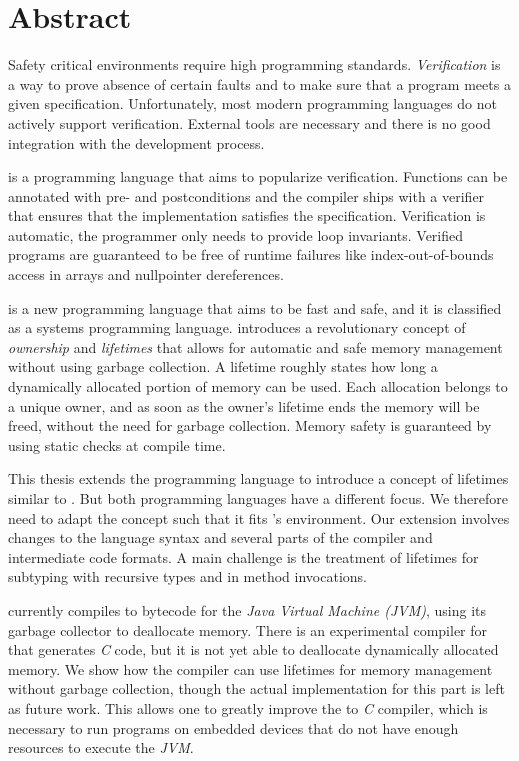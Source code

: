 \section*{Abstract}
Safety critical environments require high programming standards.
\emph{Verification}	is a way to prove absence of certain faults and to make sure that a program meets a given specification.
Unfortunately, most modern programming languages do not actively support verification.
External tools are necessary and there is no good integration with the development process.

\whiley is a programming language that aims to popularize verification.
Functions can be annotated with pre- and postconditions and the compiler ships with a verifier that ensures that the implementation satisfies the specification.
Verification is automatic, the programmer only needs to provide loop invariants.
Verified \whiley programs are guaranteed to be free of runtime failures like index-out-of-bounds access in arrays and nullpointer dereferences.

\rust is a new programming language that aims to be fast and safe, and it is classified as a systems programming language.
\rust introduces a revolutionary concept of \emph{ownership} and \emph{lifetimes} that allows for automatic and safe memory management without using garbage collection.
A lifetime roughly states how long a dynamically allocated portion of memory can be used.
Each allocation belongs to a unique owner, and as soon as the owner's lifetime ends the memory will be freed, without the need for garbage collection.
Memory safety is guaranteed by using static checks at compile time.

This thesis extends the \whiley programming language to introduce a concept of lifetimes similar to \rust.
But both programming languages have a different focus.
We therefore need to adapt the concept such that it fits \whiley's environment.
Our extension involves changes to the language syntax and several parts of the compiler and intermediate code formats.
A main challenge is the treatment of lifetimes for subtyping with recursive types and in method invocations.

\whiley currently compiles to bytecode for the \emph{Java Virtual Machine (JVM)}, using its garbage collector to deallocate memory.
There is an experimental compiler for \whiley that generates \emph{C} code, but it is not yet able to deallocate dynamically allocated memory.
We show how the compiler can use lifetimes for memory management without garbage collection, though the actual implementation for this part is left as future work.
This allows one to greatly improve the \whiley to \emph{C} compiler, which is necessary to run \whiley programs on embedded devices that do not have enough resources to execute the \emph{JVM}.

